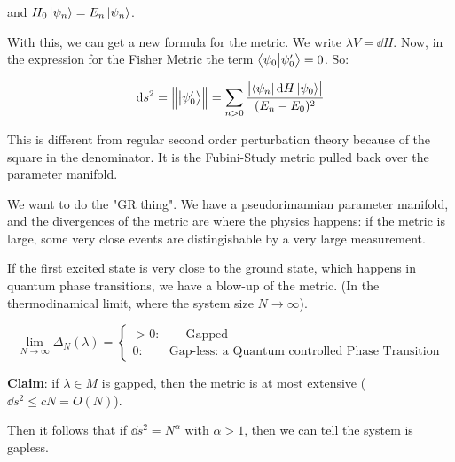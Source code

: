 \documentclass[main.tex]{subfiles}
\begin{document}
and \(H_0 \ket{\psi_n} = E_n \ket{\psi_n}\).

With this, we can get a new formula for the metric. We write \(\lambda V = \dd{H} \). Now, in the expression for the Fisher Metric the term  \(\braket{\psi_0}{\psi_0 '} = 0 \). So:

\begin{equation}
  \dd{s^2} = \norm{\ket{\psi_0 '}} = \sum _{n>0}  \frac{\abs{\bra{\psi_n} \dd{H} \ket{\psi_0}} }{(E_n - E_0)^2}
\end{equation}

This is different from regular second order perturbation theory because of the square in the denominator. It is the Fubini-Study metric pulled back over the parameter manifold.

We want to do the "GR thing". We have a pseudorimannian parameter manifold, and the divergences of the metric are where the physics happens: if the metric is large, some very close events are distingishable by a very large measurement.

If the first excited state is very close to the ground state, which happens in quantum phase transitions, we have a blow-up of the metric. (In the thermodinamical limit, where the system size \(N \rightarrow \infty\)).

\begin{equation}
   \lim _ {N \rightarrow \infty} \Delta_N(\lambda) = \begin{cases}
     > 0: \qquad \text{Gapped}  \\
     0: \qquad \text{Gap-less: a Quantum controlled Phase Transition}
 \end{cases}
\end{equation}

\textbf{Claim}: if \(\lambda \in M \) is gapped, then the metric is at most extensive (\(\dd{s^2} \leq cN = O(N) \)).

Then it follows that if \(\dd{s^2} = N^\alpha \) with \(\alpha>1\), then we can tell the system is gapless.
\end{document}
